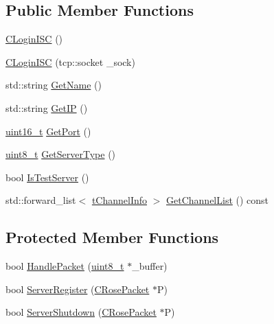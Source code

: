 \subsection*{Public Member Functions}
\begin{DoxyCompactItemize}
\item 
\hyperlink{classCLoginISC_adaee553e8084532d7463fee1da1cae07}{C\+Login\+I\+SC} ()
\item 
\hyperlink{classCLoginISC_ae9c12e9f2f0e320a09a992d071039bc7}{C\+Login\+I\+SC} (tcp\+::socket \+\_\+sock)
\item 
std\+::string \hyperlink{classCLoginISC_a34b8d105ecea104962719841a37e3786}{Get\+Name} ()
\item 
std\+::string \hyperlink{classCLoginISC_af45727298b48d1f22eb7b8e88264c210}{Get\+IP} ()
\item 
\hyperlink{stdint_8h_a273cf69d639a59973b6019625df33e30}{uint16\+\_\+t} \hyperlink{classCLoginISC_a310e4fb285e6782667bc5f6879727ca9}{Get\+Port} ()
\item 
\hyperlink{stdint_8h_aba7bc1797add20fe3efdf37ced1182c5}{uint8\+\_\+t} \hyperlink{classCLoginISC_a1591e672750ebfde6f7112978bc340e1}{Get\+Server\+Type} ()
\item 
bool \hyperlink{classCLoginISC_a7c15fded4fcbc867ffe32596630a2bcc}{Is\+Test\+Server} ()
\item 
std\+::forward\+\_\+list$<$ \hyperlink{structtChannelInfo}{t\+Channel\+Info} $>$ \hyperlink{classCLoginISC_aa5f3f45bb3d742bfc835c13c670cbaae}{Get\+Channel\+List} () const 
\end{DoxyCompactItemize}
\subsection*{Protected Member Functions}
\begin{DoxyCompactItemize}
\item 
bool \hyperlink{classCLoginISC_a86ee4bb27b8053bfb709bf110093185a}{Handle\+Packet} (\hyperlink{stdint_8h_aba7bc1797add20fe3efdf37ced1182c5}{uint8\+\_\+t} $\ast$\+\_\+buffer)
\item 
bool \hyperlink{classCLoginISC_a35205ef10251e43771adc66e27e9cfea}{Server\+Register} (\hyperlink{structCRosePacket}{C\+Rose\+Packet} $\ast$P)
\item 
bool \hyperlink{classCLoginISC_a6055504e3b8d9d0fcda6aecbfb5c91e5}{Server\+Shutdown} (\hyperlink{structCRosePacket}{C\+Rose\+Packet} $\ast$P)
\end{DoxyCompactItemize}
